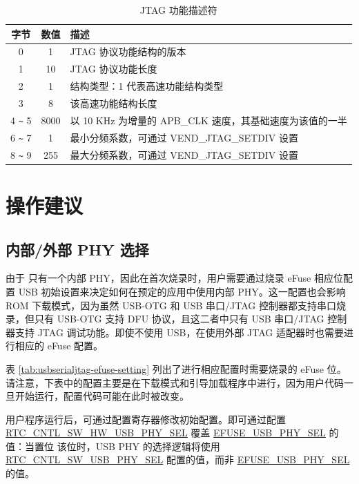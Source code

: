 \documentclass[main\_\_CN.tex]{subfiles}
\begin{document}
\begin{table}[H]
    \centering
    \caption{JTAG 功能描述符}
    \label{tab:usbserialjtag-capabilities-descriptor}
    \begin{tabular}{ |c|c|l| }
    \hline
        \rowcolor{lightgray}
        \textbf{字节} & \textbf{数值} & \textbf{描述} \\\hline

        0 &    1 &     JTAG 协议功能结构的版本 \\\hline
        1 &    10 &    JTAG 协议功能长度 \\\hline
        2 &    1 &     结构类型：1 代表高速功能结构类型 \\\hline
        3 &    8 &     该高速功能结构长度 \\\hline
        4 \verb+~+ 5 &  8000 &  以 10 KHz 为增量的 APB\_CLK 速度，其基础速度为该值的一半\\\hline
        6 \verb+~+ 7 &  1 &     最小分频系数，可通过 VEND\_JTAG\_SETDIV 设置 \\\hline
        8 \verb+~+ 9 &  255 &   最大分频系数，可通过 VEND\_JTAG\_SETDIV 设置 \\\hline
    \end{tabular}
\end{table}


\section{操作建议}
\label{sec:usbserialjtag-recommended-operation}
\subsection{内部/外部 PHY 选择}

由于 \chipname{} 只有一个内部 PHY，因此在首次烧录时，用户需要通过烧录 eFuse 相应位配置 USB 初始设置来决定如何在预定的应用中使用内部 PHY。这一配置也会影响 ROM 下载模式，因为虽然 USB-OTG 和 USB 串口/JTAG 控制器都支持串口烧录，但只有 USB-OTG 支持 DFU 协议，且这二者中只有 USB 串口/JTAG 控制器支持 JTAG 调试功能。即使不使用 USB，在使用外部 JTAG 适配器时也需要进行相应的 eFuse 配置。

表 \ref{tab:usbserialjtag-efuse-setting} 列出了进行相应配置时需要烧录的 eFuse 位。请注意，下表中的配置主要是在下载模式和引导加载程序中进行，因为用户代码一旦开始运行，配置代码可能在此时被改变。



用户程序运行后，可通过配置寄存器修改初始配置。即可通过配置 \hyperref[fielddesc:RTCCNTLSWHWUSBPHYSEL]{RTC\_CNTL\_SW\_HW\_USB\_PHY\_SEL} 覆盖 \hyperref[fielddesc:EFUSEUSBPHYSEL]{EFUSE\_USB\_PHY\_SEL} 的值：当置位 该位时，USB PHY 的选择逻辑将使用 \hyperref[fielddesc:RTCCNTLSWUSBPHYSEL]{RTC\_CNTL\_SW\_USB\_PHY\_SEL} 配置的值，而非 \hyperref[fielddesc:EFUSEUSBPHYSEL]{EFUSE\_USB\_PHY\_SEL} 的值。
\end{document}
